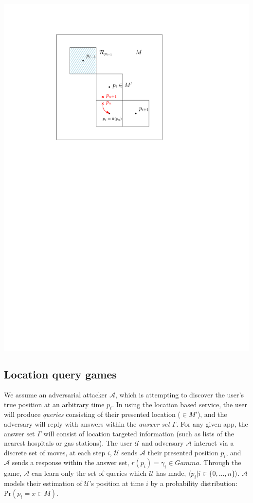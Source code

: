 \documentclass{article}
\begin{document}
\includegraphics{threat_model_image.pdf}

\subsection{Location query games}

We assume an adversarial attacker $\mathcal{A}$, which is attempting
to discover the user's true position at an arbitrary time $p_i$.  In
using the location based service, the user will produce \emph{queries}
consisting of their presented location ($\in M'$), and the adversary
will reply with answers within the \emph{answer set} $\Gamma$.  For
any given app, the answer set $\Gamma$ will consist of location
targeted information (such as lists of the nearest hospitals or gas
stations).  The user $\mathcal{U}$ and adversary $\mathcal{A}$
interact via a discrete set of moves, at each step $i$, $\mathcal{U}$
sends $\mathcal{A}$ their presented position $p_i$, and $\mathcal{A}$
sends a response within the answer set, $r(p_i) = \gamma_i \in Gamma$.
Through the game, $\mathcal{A}$ can learn only the set of queries
which $\mathcal{U}$ has made, $\langle p_i | i \in \{0,\dots,n\}
\rangle$.  $\mathcal{A}$ models their estimation of $\mathcal{U}$'s
position at time $i$ by a probability distribution: $\mathrm{Pr}(p_i =
x \in M)$.
\end{document}
